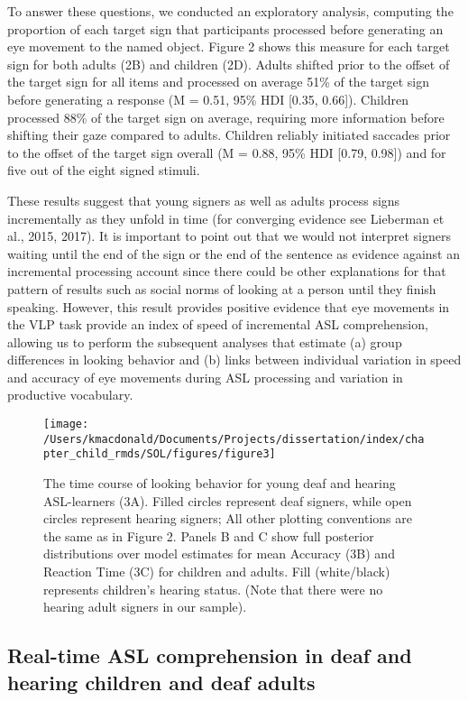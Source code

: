 \documentclass[oneside]{report}
\begin{document}
To answer these questions, we conducted an exploratory analysis,
computing the proportion of each target sign that participants processed
before generating an eye movement to the named object. Figure 2 shows
this measure for each target sign for both adults (2B) and children
(2D). Adults shifted prior to the offset of the target sign for all
items and processed on average 51\% of the target sign before generating
a response (M = 0.51, 95\% HDI {[}0.35, 0.66{]}). Children processed
88\% of the target sign on average, requiring more information before
shifting their gaze compared to adults. Children reliably initiated
saccades prior to the offset of the target sign overall (M = 0.88, 95\%
HDI {[}0.79, 0.98{]}) and for five out of the eight signed stimuli.

These results suggest that young signers as well as adults process signs
incrementally as they unfold in time (for converging evidence see
Lieberman et al., 2015, 2017). It is important to point out that we
would not interpret signers waiting until the end of the sign or the end
of the sentence as evidence against an incremental processing account
since there could be other explanations for that pattern of results such
as social norms of looking at a person until they finish speaking.
However, this result provides positive evidence that eye movements in
the VLP task provide an index of speed of incremental ASL comprehension,
allowing us to perform the subsequent analyses that estimate (a) group
differences in looking behavior and (b) links between individual
variation in speed and accuracy of eye movements during ASL processing
and variation in productive vocabulary.
\begin{figure}[t]

{\centering \texttt{[image: /Users/kmacdonald/Documents/Projects/dissertation/index/chapter\_child\_rmds/SOL/figures/figure3]} 

}

\caption[The time course of looking behavior for young deaf and hearing ASL-learners]{The time course of looking behavior for young deaf and hearing ASL-learners (3A). Filled circles represent deaf signers, while open circles represent hearing signers; All other plotting conventions are the same as in Figure 2. Panels B and C show full posterior distributions over model estimates for mean Accuracy (3B) and Reaction Time (3C) for children and adults. Fill (white/black) represents children's hearing status. (Note that there were no hearing adult signers in our sample).}\label{fig:sol-tc-coda-figure}
\end{figure}
\hypertarget{real-time-asl-comprehension-in-deaf-and-hearing-children-and-deaf-adults}{%
\subsection{Real-time ASL comprehension in deaf and hearing children and
deaf
adults}\label{real-time-asl-comprehension-in-deaf-and-hearing-children-and-deaf-adults}}
\end{document}
